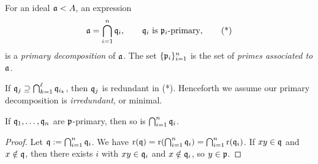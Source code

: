 \documentclass[11pt,a4paper]{article}
\begin{document}
\setcounter{definition}{9}\begin{definition}
For an ideal $\aa<A$, an expression
\[\aa=\bigcap_{i=1}^n\qq_i,\qquad\qq_i\text{ is }\pp_i\text{-primary},\tag{*}\]
is a \emph{primary decomposition} of $\aa$. The set $\{\pp_i\}_{i=1}^n$ is the set of \emph{primes associated to $\aa$}.
\end{definition}
\begin{remark}
If $\qq_j\supseteq\bigcap_{k=1}^{\ell}\qq_{i_k}$, then $\qq_j$ is redundant in (*). Henceforth we assume our primary decomposition is \emph{irredundant}, or minimal.
\end{remark}
\setcounter{theorem}{8}\begin{lemma}
If $\qq_1,\ldots,\qq_n$ are $\pp$-primary, then so is $\bigcap_{i=1}^n\qq_i$.
\end{lemma}
\begin{proof}
Let $\qq:=\bigcap_{i=1}^n\qq_i$. We have $\rad(\qq)=\rad(\bigcap_{i=1}^n\qq_i)=\bigcap_{i=1}^n\rad(\qq_i)$.
If $xy\in\qq$ and $x\notin\qq$, then there exists $i$ with $xy\in\qq_i$ and $x\notin\qq_i$, so $y\in\pp$.
\end{proof}
\end{document}
